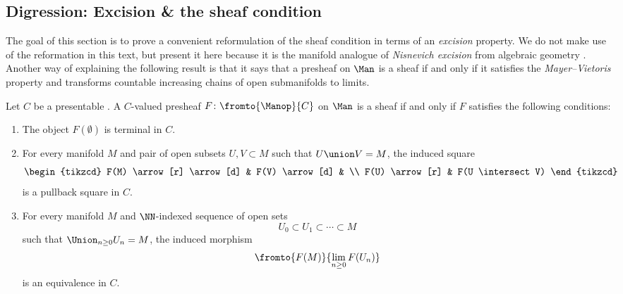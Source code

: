 
\subsection{Digression: Excision \& the sheaf condition}\label{subsec:excision}

The goal of this section is to prove a convenient reformulation of the sheaf condition in terms of an \textit{excision} property.
We do not make use of the reformation in this text, but present it here because it is the manifold analogue of \textit{Nisnevich excision} from algebraic geometry \cites[]{SAG}[\S3.2]{MR3679884}[\S3.1, Proposition 1.4]{MR1813224}.
Another way of explaining the following result is that it says that a presheaf on $ \Man $ is a sheaf if and only if it satisfies the \textit{Mayer--Vietoris} property and transforms countable increasing chains of open submanifolds to limits.

\begin{theorem}\label{thm:excision}
	Let $ C $ be a presentable \category.
	A $ C $-valued presheaf $ F \colon \fromto{\Manop}{C} $ on $ \Man $ is a sheaf if and only if $ F $ satisfies the following conditions:
	\begin{enumerate}
		\item\label{thm:excision.1} The object $ F(\emptyset) $ is terminal in $ C $.

		\item\label{thm:excision.2} For every manifold $ M $ and pair of open subsets $ U, V \subset M $ such that $ U \union V = M $, the induced square 
		\begin{equation*}
			\begin{tikzcd}
				F(M) \arrow[r] \arrow[d] & F(V) \arrow[d] & \\
				F(U) \arrow[r] & F(U \intersect V) 
			\end{tikzcd}
		\end{equation*}
		is a pullback square in $ C $.

		\item\label{thm:excision.3} For every manifold $ M $ and $ \NN $-indexed sequence of open sets
		\begin{equation*}
			U_0 \subset U_1 \subset \cdots \subset M
		\end{equation*}
		such that $ \Union_{n \geq 0} U_n = M $, the induced morphism
		\begin{equation*}
			\fromto{F(M)}{\lim_{n \geq 0} F(U_n)}
		\end{equation*}
		is an equivalence in $ C $.
	\end{enumerate}
\end{theorem}

